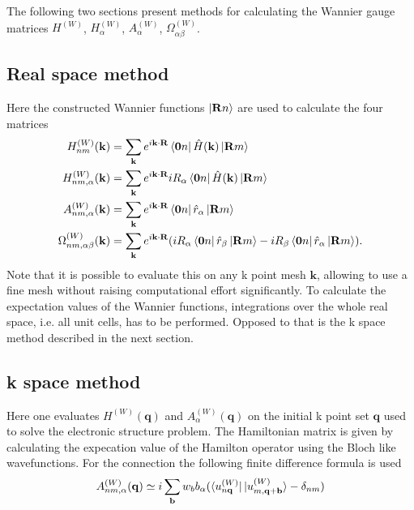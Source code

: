 \documentclass{scrreprt}
\begin{document}
The following two sections present methods for calculating the Wannier gauge matrices $H^{(W)}$, $H^{(W)}_\alpha$, $A^{(W)}_\alpha$, $\Omega^{(W)}_{\alpha \beta}$.











\subsection{Real space method}
Here the constructed Wannier functions $\ket{\mathbf{R}n}$ are used to calculate the four matrices
\begin{align}
  H^{(W)}_{nm} (\mathbf{k}) &= \sum_{\mathbf{k}} e^{i \mathbf{k} \cdot \mathbf{R}} \bra{\mathbf{0}n} \hat{H} (\mathbf{k}) \ket{\mathbf{R}m} \\
  H^{(W)}_{nm, \alpha} (\mathbf{k}) &= \sum_{\mathbf{k}} e^{i \mathbf{k} \cdot \mathbf{R}} i R_\alpha \bra{\mathbf{0}n} \hat{H} (\mathbf{k}) \ket{\mathbf{R}m} \\
  A^{(W)}_{nm, \alpha} (\mathbf{k}) &= \sum_{\mathbf{k}} e^{i \mathbf{k} \cdot \mathbf{R}}  \bra{\mathbf{0}n} \hat{r}_\alpha  \ket{\mathbf{R}m} \\
  \Omega^{(W)}_{nm, \alpha \beta} (\mathbf{k}) &= \sum_{\mathbf{k}} e^{i \mathbf{k} \cdot \mathbf{R}} ( i R_\alpha \bra{\mathbf{0}n} \hat{r}_\beta  \ket{\mathbf{R}m} -  i R_\beta \bra{\mathbf{0}n} \hat{r}_\alpha  \ket{\mathbf{R}m} ).
  \label{eq:FThamGauge}
\end{align}
Note that it is possible to evaluate this on any k point mesh $\mathbf{k}$, allowing to use a fine mesh without raising computational effort significantly. To calculate the expectation values of the Wannier functions, integrations over the whole real space, i.e. all unit cells, has to be performed. Opposed to that is the k space method described in the next section.


















\subsection{k space method}
Here one evaluates $H^{(W)}(\mathbf{q})$ and $A^{(W)}_\alpha (\mathbf{q})$  on the initial k point set $\mathbf{q}$ used to solve the electronic structure problem. 
The Hamiltonian matrix is given by calculating the expecation value of the Hamilton operator using the Bloch like wavefunctions. For the connection the following finite difference formula is used \cite{wang2006}
\begin{equation}
  A^{(W)}_{nm,\alpha}(\mathbf{q}) \simeq i \sum_\mathbf{b} w_b b_\alpha ( \bra{u^{(W)}_{n\mathbf{q}}} \ket{u^{(W)}_{m,\mathbf{q}+\mathbf{b}}} - \delta_{nm})
\end{equation}
\end{document}
